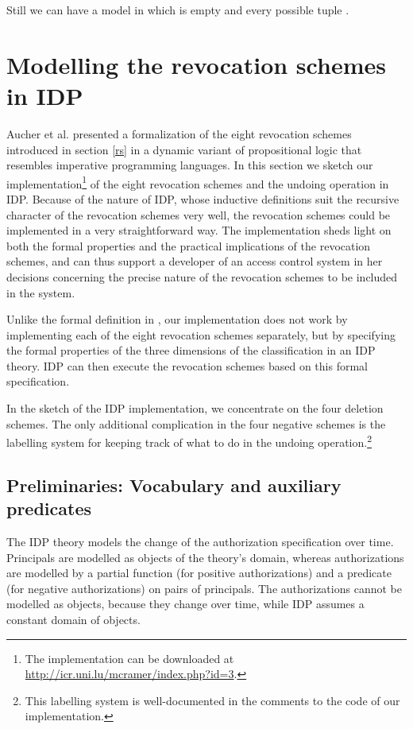 \documentclass[runningheads]{llncs}
\begin{document}
Still we can have a model in which  is empty and every possible tuple .


 

\makeatletter{}\section{Modelling the revocation schemes in IDP}
\label{prototyping}

Aucher et al. \cite{Aucher} presented a formalization of the eight revocation schemes introduced in section \ref{rs} in a dynamic variant of propositional logic that resembles imperative programming languages. In this section we sketch our implementation\footnote{The implementation can be downloaded at \url{http://icr.uni.lu/mcramer/index.php?id=3}.} of the eight revocation schemes and the undoing operation in IDP. Because of the nature of IDP, whose inductive definitions suit the recursive character of the revocation schemes very well, the revocation schemes could be implemented in a very straightforward way. The implementation sheds light on both the formal properties and the practical implications of the revocation schemes, and can thus support a developer of an access control system in her decisions concerning the precise nature of the revocation schemes to be included in the system.

Unlike the formal definition in \cite{Aucher}, our implementation does not work by implementing each of the eight revocation schemes separately, but by specifying the formal properties of the three dimensions of the classification in an IDP theory. IDP can then execute the revocation schemes based on this formal specification.

In the sketch of the IDP implementation, we concentrate on the four deletion schemes. The only additional complication in the four negative schemes is the labelling system for keeping track of what to do in the undoing operation.\footnote{This labelling system is well-documented in the comments to the code of our implementation.}


\subsection{Preliminaries: Vocabulary and auxiliary predicates}
The IDP theory models the change of the authorization specification over time. Principals are modelled as objects of the theory's domain, whereas authorizations are modelled by a partial function (for positive authorizations) and a predicate (for negative authorizations) on pairs of principals. The authorizations cannot be modelled as objects, because they change over time, while IDP assumes a constant domain of objects. 
\end{document}
